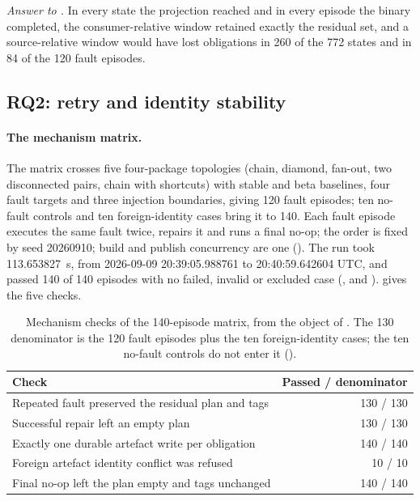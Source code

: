 \emph{Answer to .} In every state the projection reached and in every
episode the binary completed, the consumer-relative window retained exactly the
residual set, and a source-relative window would have lost obligations in 260
of the 772 states and in 84 of the 120 fault episodes.

\subsection{RQ2: retry and identity stability}
\label{sec:eval:rq2}

\paragraph{The mechanism matrix.}
The matrix crosses five four-package topologies (chain, diamond, fan-out, two
disconnected pairs, chain with shortcuts) with stable and beta baselines, four
fault targets and three injection boundaries, giving 120 fault episodes; ten
no-fault controls and ten foreign-identity cases bring it to 140. Each fault
episode executes the same fault twice, repairs it and runs a final no-op; the
order is fixed by seed 20260910; build and publish concurrency are one
(). The run took 113.653827~s, from 2026-09-09
20:39:05.988761 to 20:40:59.642604 UTC, and passed 140 of 140 episodes with no
failed, invalid or excluded case (,  and
).  gives the five checks.

\begin{table}[ht]
\centering\footnotesize
\caption{Mechanism checks of the 140-episode matrix, from the
 object of
\protect{}.
The 130 denominator is the 120 fault episodes plus the ten foreign-identity
cases; the ten no-fault controls do not enter it (\protect{}).}
\label{tab:eval:mechanism}
\begin{tabular}{@{}L{9cm}r@{}}
\toprule
Check & Passed / denominator \\
\midrule
Repeated fault preserved the residual plan and tags & 130 / 130 \\
Successful repair left an empty plan & 130 / 130 \\
Exactly one durable artefact write per obligation & 140 / 140 \\
Foreign artefact identity conflict was refused & 10 / 10 \\
Final no-op left the plan empty and tags unchanged & 140 / 140 \\
\bottomrule
\end{tabular}
\end{table}


